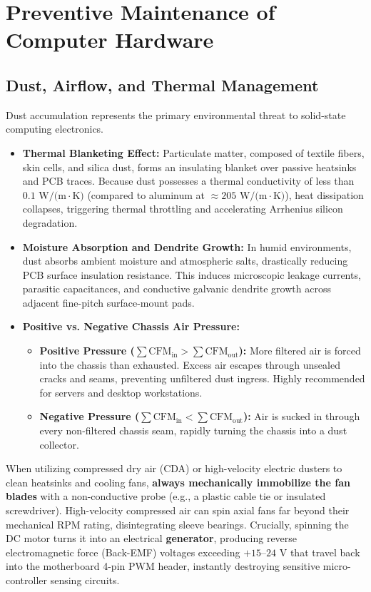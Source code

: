 \section{Preventive Maintenance of Computer Hardware}

\subsection{Dust, Airflow, and Thermal Management}
Dust accumulation represents the primary environmental threat to solid-state computing electronics.
\begin{itemize}[leftmargin=*]
    \item \textbf{Thermal Blanketing Effect:} Particulate matter, composed of textile fibers, skin cells, and silica dust, forms an insulating blanket over passive heatsinks and PCB traces. Because dust possesses a thermal conductivity of less than $0.1\text{ W/(m}\cdot\text{K)}$ (compared to aluminum at $\approx 205\text{ W/(m}\cdot\text{K)}$), heat dissipation collapses, triggering thermal throttling and accelerating Arrhenius silicon degradation.
    \item \textbf{Moisture Absorption and Dendrite Growth:} In humid environments, dust absorbs ambient moisture and atmospheric salts, drastically reducing PCB surface insulation resistance. This induces microscopic leakage currents, parasitic capacitances, and conductive galvanic dendrite growth across adjacent fine-pitch surface-mount pads.
    \item \textbf{Positive vs. Negative Chassis Air Pressure:}
    \begin{itemize}
        \item \textbf{Positive Pressure ($\sum \text{CFM}_{\text{in}} > \sum \text{CFM}_{\text{out}}$):} More filtered air is forced into the chassis than exhausted. Excess air escapes through unsealed cracks and seams, preventing unfiltered dust ingress. Highly recommended for servers and desktop workstations.
        \item \textbf{Negative Pressure ($\sum \text{CFM}_{\text{in}} < \sum \text{CFM}_{\text{out}}$):} Air is sucked in through every non-filtered chassis seam, rapidly turning the chassis into a dust collector.
    \end{itemize}
\end{itemize}

\begin{notebox}
When utilizing compressed dry air (CDA) or high-velocity electric dusters to clean heatsinks and cooling fans, \textbf{always mechanically immobilize the fan blades} with a non-conductive probe (e.g., a plastic cable tie or insulated screwdriver). High-velocity compressed air can spin axial fans far beyond their mechanical RPM rating, disintegrating sleeve bearings. Crucially, spinning the DC motor turns it into an electrical \textbf{generator}, producing reverse electromagnetic force (Back-EMF) voltages exceeding $+15\text{--}24\text{ V}$ that travel back into the motherboard 4-pin PWM header, instantly destroying sensitive micro-controller sensing circuits.
\end{notebox}

